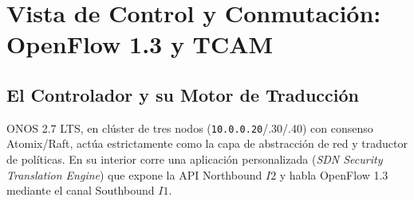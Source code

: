 \documentclass[11pt,a4paper]{report}
\begin{document}
\chapter{Vista de Control y Conmutación: OpenFlow 1.3 y TCAM}

\section{El Controlador y su Motor de Traducción}
ONOS 2.7 LTS, en clúster de tres nodos (\texttt{10.0.0.20}/.30/.40) con consenso Atomix/Raft, actúa estrictamente como la capa de abstracción de red y traductor de políticas. En su interior corre una aplicación personalizada (\emph{SDN Security Translation Engine}) que expone la API Northbound $I2$ y habla OpenFlow 1.3 mediante el canal Southbound $I1$.
\end{document}
